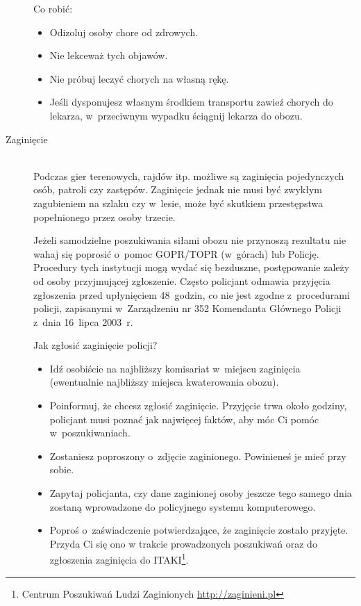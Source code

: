 \documentclass[a5paper,10pt,titlepage,twoside]{article}
\begin{document}
\begin{description}
Co robić:
\begin{itemize}
\item Odizoluj osoby chore od zdrowych.
\item Nie lekceważ tych objawów.
\item Nie próbuj leczyć chorych na własną rękę.
\item Jeśli dysponujesz własnym środkiem transportu zawieź chorych do lekarza, w~przeciwnym wypadku ściągnij lekarza do obozu.
\end{itemize}
\item[Zaginięcie] \hfill \\ Podczas gier terenowych, rajdów itp. możliwe są zaginięcia pojedynczych osób, patroli czy zastępów. Zaginięcie jednak nie musi być zwykłym zagubieniem na szlaku czy w~lesie, może być skutkiem przestępstwa popełnionego przez osoby trzecie.

Jeżeli samodzielne poszukiwania siłami obozu nie przynoszą rezultatu nie wahaj się poprosić o~pomoc GOPR/TOPR (w~górach) lub Policję. Procedury tych instytucji mogą wydać się bezduszne, postępowanie zależy od osoby przyjmującej zgłoszenie. Często policjant odmawia przyjęcia zgłoszenia przed upłynięciem 48~godzin, co nie jest zgodne z~procedurami policji, zapisanymi w~Zarządzeniu nr 352 Komendanta Głównego Policji z~dnia 16~lipca 2003~r.

Jak zgłosić zaginięcie policji?
\begin{itemize}
\item Idź osobiście na najbliższy komisariat w~miejscu zaginięcia (ewentualnie najbliższy miejsca kwaterowania obozu).
\item Poinformuj, że chcesz zgłosić zaginięcie. Przyjęcie trwa około godziny, policjant musi poznać jak najwięcej faktów, aby móc Ci pomóc w~poszukiwaniach.
\item Zostaniesz poproszony o~zdjęcie zaginionego. Powinieneś je mieć przy sobie.
\item Zapytaj policjanta, czy dane zaginionej osoby jeszcze tego samego dnia zostaną wprowadzone do policyjnego systemu komputerowego.
\item Poproś o~zaświadczenie potwierdzające, że zaginięcie zostało przyjęte. Przyda Ci się ono w trakcie prowadzonych poszukiwań oraz do zgłoszenia zaginięcia do ITAKI\footnote{Centrum Poszukiwań Ludzi Zaginionych \href{http://zaginieni.pl}{http://zaginieni.pl}}.
\end{itemize}


\end{description}
\end{document}
